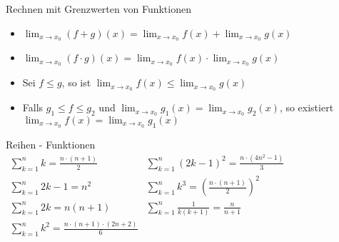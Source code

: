 \begin{corollary}{Rechnen mit Grenzwerten von Funktionen}
    \begin{itemize}
        \item $\lim_{x \to x_0} (f + g)(x) = \lim_{x \to x_0} f(x) + \lim_{x \to x_0} g(x)$
        \item $\lim_{x \to x_0} (f \cdot g)(x) = \lim_{x \to x_0} f(x) \cdot \lim_{x \to x_0} g(x)$
        \item Sei $f \leq g$, so ist $\lim_{x \to x_0} f(x) \leq \lim_{x \to x_0} g(x)$
        \item Falls $g_1 \leq f \leq g_2$ und $\lim_{x \to x_0} g_1(x) = \lim_{x \to x_0} g_2(x)$, so existiert $\lim_{x \to x_0} f(x) = \lim_{x \to x_0} g_1(x)$
    \end{itemize}
\end{corollary}

\begin{definition}{Reihen - Funktionen}\\
        $
        \begin{array}{ll}
            \sum^{n}_{k=1} k = \frac{n \cdot (n+1)}{2} & \sum^{n}_{k=1} (2k - 1)^2 = \frac{n \cdot (4n^2-1)}{3}\\
            \sum^{n}_{k=1} 2k-1 = n^2 & \sum^{n}_{k=1} k^3 = ( \frac{n \cdot (n+1)}{2})^2\\
            \sum^{n}_{k=1} 2k = n(n+1) & \sum^{n}_{k=1} \frac{1}{k(k+1)} = \frac{n}{n+1}\\
            \sum^{n}_{k=1} k^2 = \frac{n \cdot (n+1) \cdot (2n+2)}{6} &
        \end{array}
        $
    \end{definition}



